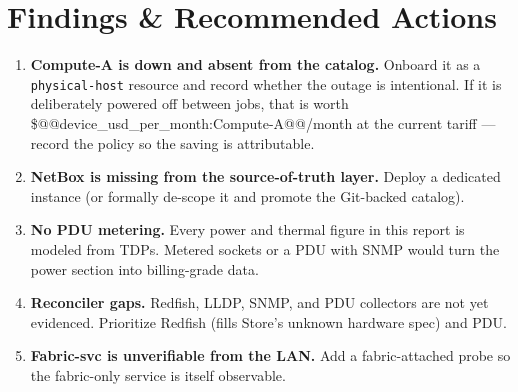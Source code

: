 \section{Findings \& Recommended Actions}
\begin{enumerate}[leftmargin=1.6em]
\item \textbf{Compute-A is down and absent from the catalog.} Onboard it as a
  \texttt{physical-host} resource and record whether the outage is intentional.
  If it is deliberately powered off between jobs, that is worth
  \$@@device_usd_per_month:Compute-A@@/month at the current tariff --- record the
  policy so the saving is attributable.
\item \textbf{NetBox is missing from the source-of-truth layer.} Deploy a
  dedicated instance (or formally de-scope it and promote the Git-backed
  catalog).
\item \textbf{No PDU metering.} Every power and thermal figure in this report
  is modeled from TDPs. Metered sockets or a PDU with SNMP would turn the
  power section into billing-grade data.
\item \textbf{Reconciler gaps.} Redfish, LLDP, SNMP, and PDU collectors are
  not yet evidenced. Prioritize Redfish (fills Store's unknown hardware spec)
  and PDU.
\item \textbf{Fabric-svc is unverifiable from the LAN.} Add a fabric-attached
  probe so the fabric-only service is itself observable.
\end{enumerate}
